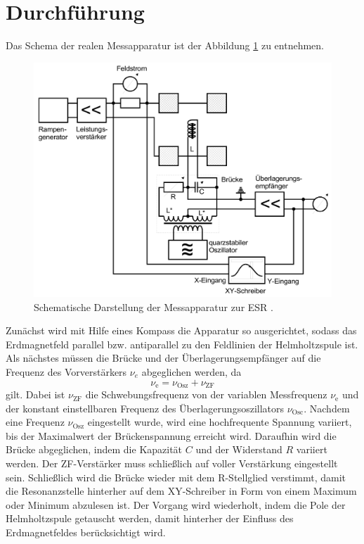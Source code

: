 \section{Durchführung}
Das Schema der realen Messapparatur ist der Abbildung \ref{fig:ESR2} zu entnehmen.

\begin{figure}[H]
  \centering
  \includegraphics[width=\textwidth]{ESR2.png}
  \caption{Schematische Darstellung der Messapparatur zur ESR \cite{skript}.}
  \label{fig:ESR2}
\end{figure}

Zunächst wird mit Hilfe eines Kompass die Apparatur so ausgerichtet, sodass das Erdmagnetfeld parallel bzw. antiparallel zu den Feldlinien der Helmholtzspule ist.
Als nächstes müssen die Brücke und der Überlagerungsempfänger auf die Frequenz des Vorverstärkers $\nu_e$ abgeglichen werden, da
\begin{equation*}
  \nu_{\text{e}} = \nu_{\text{Osz}} + \nu_{\text{ZF}}
\end{equation*}
gilt.
Dabei ist $\nu_{\text{ZF}}$ die Schwebungsfrequenz von der variablen Messfrequenz $\nu_{\text{e}}$ und der konstant einstellbaren Frequenz des Überlagerungsoszillators $\nu_{\text{Osc}}$.
Nachdem eine Frequenz $\nu_{\text{Osz}}$ eingestellt wurde, wird eine hochfrequente Spannung variiert, bis der Maximalwert der Brückenspannung erreicht wird.
Daraufhin wird die Brücke abgeglichen, indem die Kapazität $C$ und der Widerstand $R$ variiert werden.
Der ZF-Verstärker muss schließlich auf voller Verstärkung eingestellt sein.
Schließlich wird die Brücke wieder mit dem R-Stellglied verstimmt, damit die Resonanzstelle hinterher auf dem XY-Schreiber in Form von einem Maximum oder Minimum abzulesen ist.
Der Vorgang wird wiederholt, indem die Pole der Helmholtzspule getauscht werden, damit hinterher der Einfluss des Erdmagnetfeldes berücksichtigt wird.
